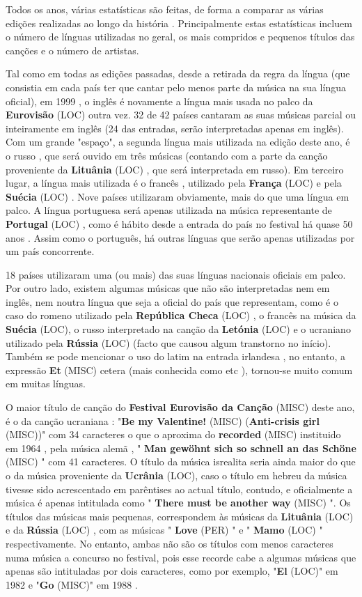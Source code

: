 \documentclass[12pt,a4paper]{article}
\begin{document}
Todos os anos, várias estatísticas são feitas, de forma a comparar as várias edições realizadas ao longo da história . Principalmente estas estatísticas incluem o número de línguas utilizadas no geral, os mais compridos e pequenos títulos das canções e o número de artistas.

Tal como em todas as edições passadas, desde a retirada da regra da língua (que consistia em cada país ter que cantar pelo menos parte da música na sua língua oficial), em 1999 , o inglês é novamente a língua mais usada no palco da \textbf{Eurovisão} (LOC) outra vez. 32 de 42 países cantaram as suas músicas parcial ou inteiramente em inglês (24 das entradas, serão interpretadas apenas em inglês). Com um grande "espaço", a segunda língua mais utilizada na edição deste ano, é o russo , que será ouvido em três músicas (contando com a parte da canção proveniente da \textbf{Lituânia} (LOC) , que será interpretada em russo). Em terceiro lugar, a língua mais utilizada é o francês , utilizado pela \textbf{França} (LOC) e pela \textbf{Suécia} (LOC) . Nove países utilizaram obviamente, mais do que uma língua em palco. A língua portuguesa será apenas utilizada na música representante de \textbf{Portugal} (LOC) , como é hábito desde a entrada do país no festival há quase 50 anos . Assim como o português, há outras línguas que serão apenas utilizadas por um país concorrente.

18 países utilizaram uma (ou mais) das suas línguas nacionais oficiais em palco. Por outro lado, existem algumas músicas que não são interpretadas nem em inglês, nem noutra língua que seja a oficial do país que representam, como é o caso do romeno utilizado pela \textbf{República Checa} (LOC) , o francês na música da \textbf{Suécia} (LOC), o russo interpretado na canção da \textbf{Letónia} (LOC) e o ucraniano utilizado pela \textbf{Rússia} (LOC) (facto que causou algum transtorno no início). Também se pode mencionar o uso do latim na entrada irlandesa , no entanto, a expressão \textbf{Et} (MISC) cetera (mais conhecida como etc ), tornou-se muito comum em muitas línguas.

O maior título de canção do \textbf{Festival Eurovisão da Canção} (MISC) deste ano, é o da canção ucraniana : "\textbf{Be my Valentine!} (MISC) (\textbf{Anti-crisis girl} (MISC))" com 34 caracteres o que o aproxima do \textbf{recorded} (MISC) instituido em 1964 , pela música alemã , " \textbf{Man gewöhnt sich so schnell an das Schöne} (MISC) " com 41 caracteres. O título da música isrealita seria ainda maior do que o da música proveniente da \textbf{Ucrânia} (LOC), caso o título em hebreu da música tivesse sido acrescentado em parêntises ao actual título, contudo, e oficialmente a música é apenas intitulada como " \textbf{There must be another way} (MISC) ". Os títulos das músicas mais pequenas, correspondem às músicas da \textbf{Lituânia} (LOC) e da \textbf{Rússia} (LOC) , com as músicas " \textbf{Love} (PER) " e " \textbf{Mamo} (LOC) " respectivamente. No entanto, ambas não são os títulos com menos caracteres numa música a concurso no festival, pois esse recorde cabe a algumas músicas que apenas são intituladas por dois caracteres, como por exemplo, "\textbf{El} (LOC)" em 1982 e "\textbf{Go} (MISC)" em 1988 .
\end{document}
